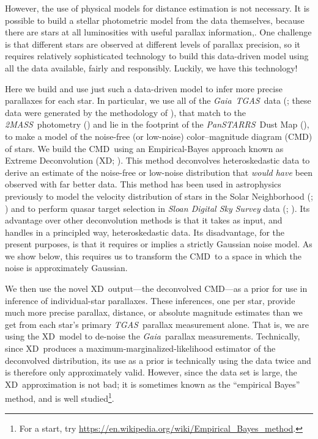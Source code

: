 \documentclass[modern]{aastex61}
\newcommand{\acronym}[1]{{\small{#1}}}
\newcommand{\project}[1]{\textsl{#1}}
\newcommand{\tgas}{\project{\acronym{TGAS}}}
\newcommand{\tmass}{\project{\acronym{2MASS}}}
\newcommand{\gaia}{\project{Gaia}}
\newcommand{\panstarrs}{\project{Pan\acronym{STARRS}}}
\newcommand{\xd}{\acronym{XD}}
\newcommand{\cmd}{\acronym{CMD}}
\begin{document}
However, the use of physical models for distance estimation is not necessary.
It is possible to build a stellar photometric model from the data themselves,
because there are stars at all luminosities with useful parallax information,.
One challenge is that different stars are observed at different levels of parallax precision,
so it requires relatively sophisticated technology to build this data-driven model
using all the data available, fairly and responsibly.
Luckily, we have this technology!

Here we build and use just such a data-driven model to infer more precise parallaxes for each star.
In particular, we use all of the \gaia\ \tgas\ data (\citealt{tgas};
these data were generated by the methodology of \citealt{michalik15}), that match to the
\tmass\ photometry (\citealt{skrutskie06}) and lie in the footprint of
the \panstarrs\ Dust Map (\citealt{green15}), to make a model of the
noise-free (or low-noise) color--magnitude diagram (\cmd) of stars.
We build the \cmd\ using an Empirical-Bayes approach known as Extreme Deconvolution (XD;
\citealt{bovy11}).
This method deconvolves heteroskedastic data to derive an
estimate of the noise-free or low-noise distribution that \emph{would
  have} been observed with far better data.
This method has been used in astrophysics
previously to model the velocity distribution of stars in the Solar
Neighborhood (\citealt{hogg05}; \citealt{bovy09}) and to
perform quasar target selection
in \project{Sloan Digital Sky Survey} data (\citealt{xdqso}; \citealt{xdqsoz}).
Its advantage over other deconvolution methods is that it takes as input,
and handles in a principled way, heteroskedastic data.
Its disadvantage, for the present purposes, is that it requires
or implies a strictly Gaussian noise model.
As we show below, this requires us to transform the \cmd\ to a space in which
the noise is approximately Gaussian.

We then use the novel \xd\ output---the deconvolved \cmd---as
a prior for use in inference of individual-star parallaxes.
These inferences, one per star, provide much more precise parallax, distance,
or absolute magnitude estimates than we get from each star's primary
\tgas\ parallax measurement alone.
That is, we are using the \xd\ model to de-noise the \gaia\ parallax
measurements.
Technically, since \xd\ produces a maximum-marginalized-likelihood estimator
of the deconvolved distribution,
its use as a prior is technically using the data twice and is therefore only approximately valid.
However, since the data set is large, the \xd\ approximation is not bad; it is
sometimes known as the ``empirical Bayes'' method, and is well studied\footnote{For a start, try \url{https://en.wikipedia.org/wiki/Empirical_Bayes_method}.}.
\end{document}

